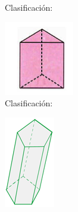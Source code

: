 \begin{figure}[H]
\begin{subfigure}{.18\linewidth}
        \caption{Clasificación:\\}
        \label{sfig:sinma2_aiu3_ac79_img06}
    \end{subfigure}\qquad
    \begin{subfigure}{.18\linewidth}
        \centering
        \includegraphics[width=\linewidth]{../images/sinma2_aiu3_ac79_img07}
        \caption{Clasificación:\\}
        \label{sfig:sinma2_aiu3_ac79_img07}
    \end{subfigure}\qquad
    \begin{subfigure}{.25\linewidth}
        \centering
        \includegraphics[width=.45\linewidth]{../images/sinma2_aiu3_ac79_img08}

\end{subfigure}
\end{figure}
